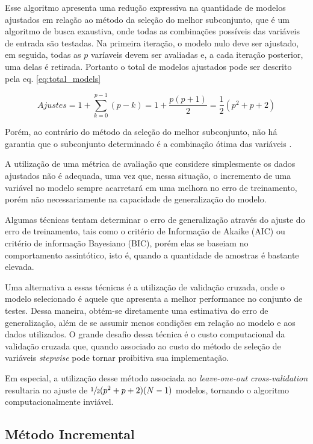 \qquad

Esse algoritmo apresenta uma redução expressiva na quantidade de modelos ajustados em relação ao método da 
seleção do melhor subconjunto, que é um algoritmo de busca exaustiva, onde todas as combinações possíveis das 
variáveis de entrada são testadas. Na primeira iteração, o modelo nulo deve ser ajustado, em seguida, todas as 
$p$ varíaveis devem ser avaliadas e, a cada iteração posterior, uma delas é retirada. Portanto o total de 
modelos ajustados pode ser descrito pela eq. \ref{eq:total_models}

\begin{equation}
    Ajustes = 1 + \sum^{p-1}_{k = 0} (p-k) = 1 + \dfrac{p (p+1)}{2} =  \dfrac{1}{2} (p^2 + p  + 2)
    \label{eq:total_models}
\end{equation}

Porém, ao contrário do método da seleção do melhor subconjunto, não há garantia que o subconjunto determinado é 
a combinação ótima das variáveis \cite[p. 208]{intro_stat_learn}.

A utilização de uma métrica de avaliação que considere simplesmente os dados ajustados não é adequada, 
uma vez que, nessa situação, o incremento de uma variável no modelo sempre acarretará em uma melhora no erro de 
treinamento, porém não necessariamente na capacidade de generalização do modelo.

Algumas técnicas tentam determinar o erro de generalização através do ajuste do erro de treinamento, tais como o 
critério de Informação de Akaike (AIC) ou critério de informação Bayesiano (BIC), porém elas se baseiam no 
comportamento assintótico, isto é, quando a quantidade de amostras é bastante elevada.

Uma alternativa a essas técnicas é a utilização de validação cruzada, onde o modelo selecionado é aquele que 
apresenta a melhor performance no conjunto de testes. Dessa maneira, obtém-se diretamente uma estimativa do erro 
de generalização, além de se assumir menos condições em relação ao modelo e aos dados utilizados. O grande 
desafio dessa técnica é o custo computacional da validação cruzada que, quando associado ao custo do método de 
seleção de variáveis \textit{stepwise} pode tornar proibitiva sua implementação.

Em especial, a utilização desse método associada ao \textit{leave-one-out cross-validation} resultaria no ajuste 
de $\sfrac{1}{2}(p^2+p+2)(N-1)$ modelos, tornando o algoritmo computacionalmente inviável.

\subsection{Método Incremental}

